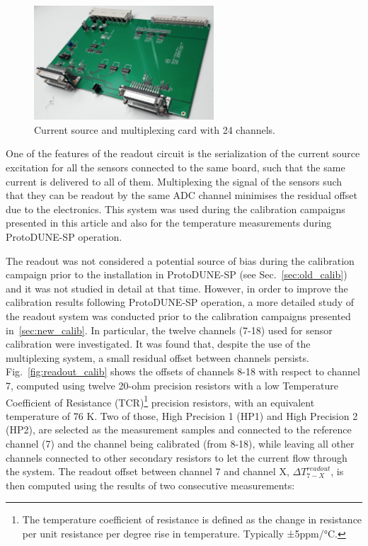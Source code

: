 \begin{figure}[htbp]
\centering
\includegraphics[width=0.6\textwidth]{images/figure_2.png}
\caption{Current source and multiplexing card with 24 channels.
\label{fig:readout}}
\end{figure}

\noindent
One of the features of the readout circuit is the serialization of the current source excitation for all the sensors connected to the same board, such that the same current is delivered to all of them. Multiplexing the signal of the sensors such that they can be readout by the same ADC channel minimises the residual offset due to the electronics. This system was used during the calibration campaigns presented in this article and also for the temperature measurements during ProtoDUNE-SP operation.

The readout was not considered a potential source of bias during the calibration campaign prior to the installation in ProtoDUNE-SP (see Sec.~\ref{sec:old_calib}) and it was not studied in detail at that time. However, in order to improve the calibration results following ProtoDUNE-SP operation, a more detailed study of the readout system was conducted prior to the calibration campaigns presented in~\ref{sec:new_calib}. In particular, the twelve channels (7-18) used for sensor calibration were investigated. It was found that, despite the use of the multiplexing system, a small residual offset between channels persists. Fig.~\ref{fig:readout_calib} shows the offsets of channels 8-18 with respect to channel 7, computed using twelve 20-ohm precision resistors with a low Temperature Coefficient of Resistance (TCR)\footnote{The temperature coefficient of resistance is defined as the change in resistance per unit resistance per degree rise in temperature. Typically ±5ppm/°C.} precision resistors, with an equivalent temperature of 76 K. Two of those, High Precision 1 (HP1) and High Precision 2 (HP2), are selected as the measurement samples and connected to the reference channel (7) and the channel being calibrated (from 8-18), while leaving all other channels connected to other secondary resistors to let the current flow through the system. The readout offset between channel 7 and channel X, $\Delta T_{7-X}^{readout}$, is then computed using the results of two consecutive measurements:

